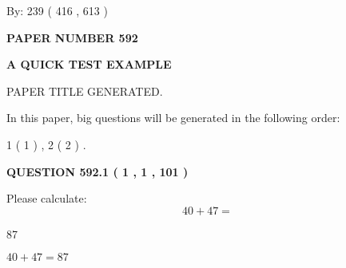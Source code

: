 \documentclass[12pt]{article}
\begin{document}
   
\hspace{1.0in} By: 
 239 ( 416 ,  613 )
   
   
   
   
\newpage 
\setcounter{page}{ 
   592001 } 
   
   
   
   
 {\textbf{ \Large{ PAPER NUMBER  592  }}}
   
   
\vspace{0.2in}
   
   
   
   
   
   
   
   
 \vspace{0.2in}
{\LARGE {\textbf{ A QUICK TEST EXAMPLE}}}
   
   
 PAPER TITLE GENERATED.
   
   
   
\vspace{0.2in}
   
In this paper, big questions will be generated in the following order: 
   
   
   1 ( 1 )
 ,
   2 ( 2 )
 .
  
\vspace{0.2in}
  
{\textbf{\Large{QUESTION
592.1 
 ( 1 , 1 , 101 )
}}}
  
  
 
Please calculate:
\begin{equation}
40 +  %
47 = \nonumber
\end{equation}
 
 
 
\noindent{}
 
 

87
 
 
\noindent{}
 
 

 
 
 
\noindent{}
 
 

$ %
40 +  %
47=   %
87$
 
 
\noindent{}
 
\end{document}

